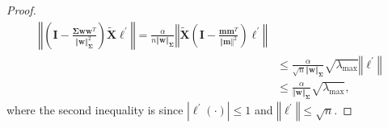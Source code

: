 \documentclass[pdflatex,sn-basic]{sn-jnl}%
\theoremstyle{thmstyleone}%
\begin{document}
\begin{appendices}
\begin{proof}
\begin{equation*}
\begin{aligned}
    \left\Vert
      \left(
        \mathbf{I} - \frac{\mathbf{\Sigma} \mathbf{w} \mathbf{w}^{T}}{\Vert \mathbf{w} \Vert_{\mathbf{\Sigma}}^{2}}
      \right)
      \tilde{\mathbf{X}} 
      \boldsymbol{\ell^\prime}
    \right\Vert
    =
    \frac{\alpha}{n \Vert \mathbf{w} \Vert_{\mathbf{\Sigma}}}
    \left\Vert
      \tilde{\mathbf{X}}
      \left(
        \mathbf{I} - \frac{\mathbf{m} \mathbf{m}^{T}}{\Vert \mathbf{m} \Vert^{2}}
      \right)
      \boldsymbol{\ell^\prime}
    \right\Vert
    \\ & \le
    \frac{\alpha}{\sqrt{n} \Vert \mathbf{w} \Vert_{\mathbf{\Sigma}}}
    \sqrt{\lambda_{\max}}
    \left\Vert
    \boldsymbol{\ell^\prime}
    \right\Vert
    \\ & \le
    \frac{\alpha}{\Vert \mathbf{w} \Vert_{\mathbf{\Sigma}}}
    \sqrt{\lambda_{\max}}
    ,
  \end{aligned}
  \end{equation*}
  where the second inequality is since $|\ell^{\prime} \left(\cdot\right)| \le 1$ and 
  $\left\Vert
    \boldsymbol{\ell^\prime}
  \right\Vert \le \sqrt{n}$.


\end{proof}
\end{appendices}
\end{document}
